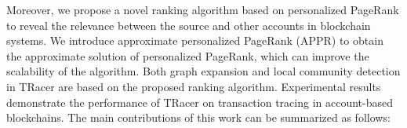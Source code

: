 % 
Moreover, we propose a novel ranking algorithm based on personalized PageRank \cite{page1999pagerank} to reveal the relevance between the source and other accounts in blockchain systems. We introduce approximate personalized PageRank (APPR) \cite{andersen2006local,andersen2007local,yin2017local} to obtain the approximate solution of personalized PageRank, which can improve the scalability of the algorithm. Both graph expansion and local community detection in TRacer are based on the proposed ranking algorithm. 
Experimental results demonstrate the performance of TRacer on transaction tracing in account-based blockchains. The main contributions of this work can be summarized as follows:
